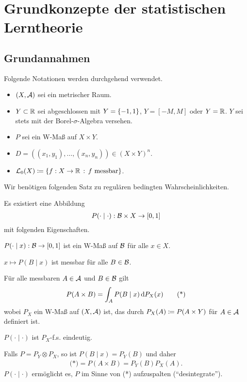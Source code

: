 \chapter{Grundkonzepte der statistischen Lerntheorie}
\newcommand{\class}{\mathrm{class}}
\newcommand{\diam}{\mathrm{diam}}

\section{Grundannahmen}

Folgende Notationen werden durchgehend verwendet.
\begin{itemize}
  \item $(X,\AA)$ sei ein metrischer Raum.
  \item $Y\subset\R$ sei abgeschlossen mit $Y=\setd{-1,1}$, $Y=[-M,M]$ oder
  $Y=\R$. $Y$ sei stets mit der Borel-$\sigma$-Algebra versehen.
  \item $P$ sei ein W-Maß auf $X\times Y$.
  \item $D=((x_1,y_1),\ldots,(x_n,y_n))\in(X\times Y)^n$.
  \item $\LL_0(X)\defl\setdef{f:X\to \R}{f\text{ messbar}}$.
\end{itemize}

Wir benötigen folgenden Satz zu regulären bedingten Wahrscheinlichkeiten.
\begin{prop*}
Es existiert eine Abbildung
\begin{align*}
P(\cdot\mid\cdot) : \BB\times X\to [0,1]
\end{align*}
mit folgenden Eigenschaften.
\begin{propenum}
\item $P(\cdot\mid x): \BB \to [0,1]$ ist ein W-Maß auf $\BB$ für alle $x\in X$.
\item $x\mapsto P(B\mid x)$ ist messbar für alle $B\in\BB$.
\item Für alle messbaren $A\in\AA$ und $B\in\BB$ gilt
\begin{align*}
P(A\times B) = \int_A P(B\mid x)\dP_X(x)\tag{*}
\end{align*}
wobei $P_X$ ein W-Maß auf $(X,\AA)$ ist, das durch $P_X(A) \defl P(A\times Y)$ für
$A\in\AA$ definiert ist.
\item $P(\cdot\mid\cdot)$ ist $P_X$-f.s. eindeutig.\fishhere
\end{propenum}
\end{prop*}

\begin{bem*}[Interpretation.]
Falls $P=P_Y\otimes P_X$, so ist $P(B\mid x) = P_Y(B)$ und daher
\begin{align*}
\text{(*)} = P(A\times B) = P_Y(B)P_X(A).
\end{align*}
$P(\cdot\mid\cdot)$ ermöglicht es, $P$ im Sinne von (*) aufzuspalten
(``desintegrate'').\maphere
\end{bem*}

